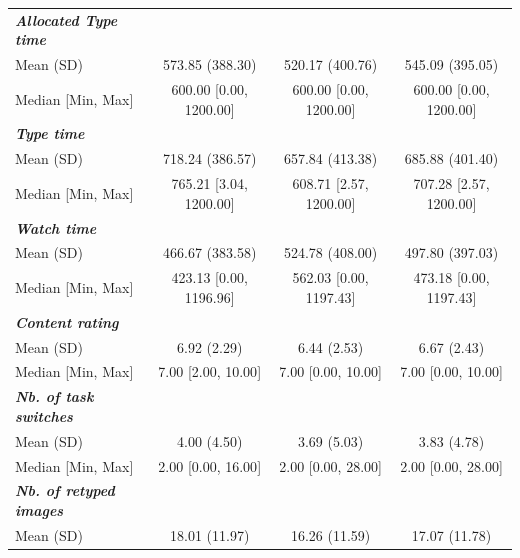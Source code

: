 \documentclass[11pt,a4paper,oneside]{article}
\begin{document}
\begin{table}[]
{\begin{tabular}{@{}lccc@{}}
\textbf{\textit{Allocated Type time}}           &                            &                            &                            \\
Mean (SD)             & 573.85 (388.30)            & 520.17 (400.76)            & 545.09 (395.05)            \\
Median {[}Min, Max{]} & 600.00 {[}0.00, 1200.00{]} & 600.00 {[}0.00, 1200.00{]} & 600.00 {[}0.00, 1200.00{]} \\\hline
\textbf{\textit{Type time}}             &                            &                            &                            \\
Mean (SD)             & 718.24 (386.57)            & 657.84 (413.38)            & 685.88 (401.40)            \\
Median {[}Min, Max{]} & 765.21 {[}3.04, 1200.00{]} & 608.71 {[}2.57, 1200.00{]} & 707.28 {[}2.57, 1200.00{]} \\\hline
\textbf{\textit{Watch time}}            &                            &                            &                            \\
Mean (SD)             & 466.67 (383.58)            & 524.78 (408.00)            & 497.80 (397.03)            \\
Median {[}Min, Max{]} & 423.13 {[}0.00, 1196.96{]} & 562.03 {[}0.00, 1197.43{]} & 473.18 {[}0.00, 1197.43{]} \\ \hline
\textbf{\textit{Content rating}}        &                            &                            &                            \\
Mean (SD)             & 6.92 (2.29)                & 6.44 (2.53)                & 6.67 (2.43)                \\
Median {[}Min, Max{]} & 7.00 {[}2.00, 10.00{]}     & 7.00 {[}0.00, 10.00{]}     & 7.00 {[}0.00, 10.00{]}     \\\hline
\textbf{\textit{Nb. of task switches}}  &                            &                            &                            \\
Mean (SD)             & 4.00 (4.50)                & 3.69 (5.03)                & 3.83 (4.78)                \\
Median {[}Min, Max{]} & 2.00 {[}0.00, 16.00{]}     & 2.00 {[}0.00, 28.00{]}     & 2.00 {[}0.00, 28.00{]}     \\\hline
\textbf{\textit{Nb. of retyped images}} &                            &                            &                            \\
Mean (SD)             & 18.01 (11.97)              & 16.26 (11.59)              & 17.07 (11.78)              \\

\end{tabular}}
\end{table}
\end{document}
